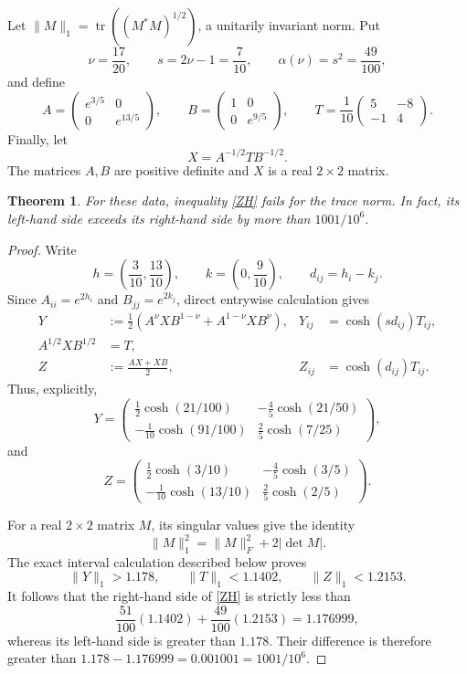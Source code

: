 \documentclass[11pt]{article}
\newtheorem{theorem}{Theorem}
\newcommand{\trnorm}[1]{\lVert#1\rVert_1}
\begin{document}
Let \(\trnorm{M}=\operatorname{tr}((M^*M)^{1/2})\), a unitarily
invariant norm.  Put
\[
 \nu=\frac{17}{20},\qquad s=2\nu-1=\frac7{10},
 \qquad \alpha(\nu)=s^2=\frac{49}{100},
\]
and define
\[
 A=\begin{pmatrix}e^{3/5}&0\\0&e^{13/5}\end{pmatrix},\qquad
 B=\begin{pmatrix}1&0\\0&e^{9/5}\end{pmatrix},\qquad
 T=\frac1{10}\begin{pmatrix}5&-8\\-1&4\end{pmatrix}.
\]
Finally, let
\[
 X=A^{-1/2}TB^{-1/2}.
\]
The matrices \(A,B\) are positive definite and \(X\) is a real
\(2\times2\) matrix.

\begin{theorem}
For these data, inequality \eqref{ZH} fails for the trace norm.  In fact,
its left-hand side exceeds its right-hand side by more than
\(1001/10^6\).
\end{theorem}

\begin{proof}
Write
\[
 h=\left(\frac3{10},\frac{13}{10}\right),\qquad
 k=\left(0,\frac9{10}\right),\qquad d_{ij}=h_i-k_j.
\]
Since \(A_{ii}=e^{2h_i}\) and \(B_{jj}=e^{2k_j}\), direct entrywise
calculation gives
\begin{align*}
 Y&:=\frac12\left(A^\nu XB^{1-\nu}+A^{1-\nu}XB^\nu\right),
 &Y_{ij}&=\cosh(sd_{ij})T_{ij},\\
 A^{1/2}XB^{1/2}&=T,\\
 Z&:=\frac{AX+XB}{2},
 &Z_{ij}&=\cosh(d_{ij})T_{ij}.
\end{align*}
Thus, explicitly,
\[
Y=\begin{pmatrix}
 \frac12\cosh(21/100)&-\frac45\cosh(21/50)\\
 -\frac1{10}\cosh(91/100)&\frac25\cosh(7/25)
\end{pmatrix},
\]
and
\[
Z=\begin{pmatrix}
 \frac12\cosh(3/10)&-\frac45\cosh(3/5)\\
 -\frac1{10}\cosh(13/10)&\frac25\cosh(2/5)
\end{pmatrix}.
\]

For a real \(2\times2\) matrix \(M\), its singular values give the
identity
\begin{equation}
 \trnorm{M}^2=\lVert M\rVert_F^2+2|\det M|.
 \label{traceformula}
\end{equation}
The exact interval calculation described below proves
\begin{equation}
 \trnorm{Y}>1.178,\qquad
 \trnorm{T}<1.1402,\qquad
 \trnorm{Z}<1.2153.
 \label{bounds}
\end{equation}
It follows that the right-hand side of \eqref{ZH} is strictly less than
\[
 \frac{51}{100}(1.1402)+\frac{49}{100}(1.2153)
 =1.176999,
\]
whereas its left-hand side is greater than \(1.178\).  Their difference
is therefore greater than
\(1.178-1.176999=0.001001=1001/10^6\).
\end{proof}
\end{document}
